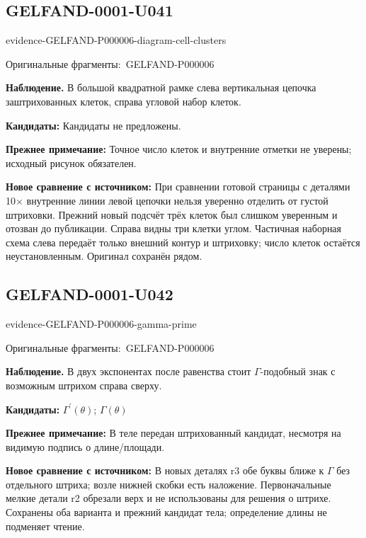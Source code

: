 \documentclass[11pt]{article}
\newcommand{\EvidenceBlock}[4]{%
 \par\smallskip\noindent\begin{minipage}{\linewidth}
 \begin{minipage}[t]{.47\linewidth}\vspace{0pt}\centering
 \csname evidence-#1-#2\endcsname\par
 {\scriptsize\SourceCropCaption\ #1}\par
 \end{minipage}\hfill
 \begin{minipage}[t]{.49\linewidth}\vspace{0pt}\raggedright
 {\small\color{orange!65!black}\textbf{#4} #3}\par
 \end{minipage}
 \end{minipage}\par\smallskip}
\newcommand{\SourceCropCaption}{Оригинальные фрагменты:}\newcommand{\ReadingCaption}{Сомнительное чтение.}\newcommand{\IncompleteCaption}{Неразобранный фрагмент.}\newcommand{\DiagramCaption}{Рисунок и набранное описание.}
\begin{document}
\subsection*{GELFAND-0001-U041}
\EvidenceBlock{GELFAND-P000006}{diagram-cell-clusters}{В большой квадратной рамке слева вертикальная цепочка заштрихованных клеток, справа угловой набор клеток.}{Наблюдение.}
\par\smallskip\noindent\textbf{Кандидаты: } Кандидаты не предложены.\par
\par\smallskip\noindent\textbf{Прежнее примечание: } Точное число клеток и внутренние отметки не уверены; исходный рисунок обязателен.\par
\par\smallskip\noindent\textbf{Новое сравнение с источником: } При сравнении готовой страницы с деталями 10× внутренние линии левой цепочки нельзя уверенно отделить от густой штриховки. Прежний новый подсчёт трёх клеток был слишком уверенным и отозван до публикации. Справа видны три клетки углом. Частичная наборная схема слева передаёт только внешний контур и штриховку; число клеток остаётся неустановленным. Оригинал сохранён рядом.\par

\subsection*{GELFAND-0001-U042}
\EvidenceBlock{GELFAND-P000006}{gamma-prime}{В двух экспонентах после равенства стоит \(\Gamma\)-подобный знак с возможным штрихом справа сверху.}{Наблюдение.}
\par\smallskip\noindent\textbf{Кандидаты: } \(\Gamma^{\prime}(\theta)\); \(\Gamma(\theta)\)\par
\par\smallskip\noindent\textbf{Прежнее примечание: } В теле передан штрихованный кандидат, несмотря на видимую подпись о длине/площади.\par
\par\smallskip\noindent\textbf{Новое сравнение с источником: } В новых деталях r3 обе буквы ближе к \(\Gamma\) без отдельного штриха; возле нижней скобки есть наложение. Первоначальные мелкие детали r2 обрезали верх и не использованы для решения о штрихе. Сохранены оба варианта и прежний кандидат тела; определение длины не подменяет чтение.\par
\end{document}
